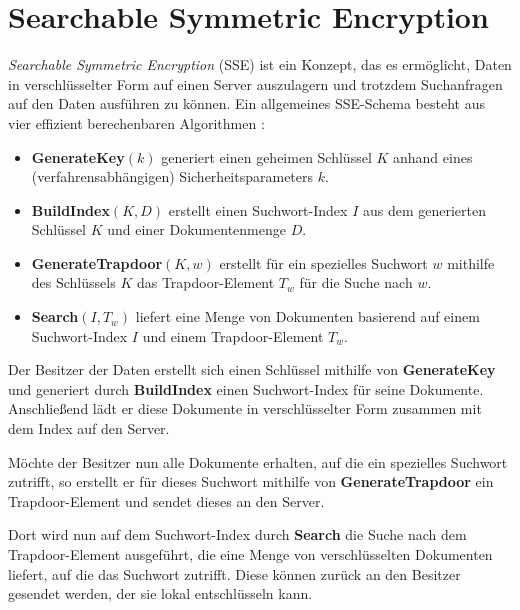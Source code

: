 \section{Searchable Symmetric Encryption}

\label{sec_basisc_se}


\textit{Searchable Symmetric Encryption} (SSE) ist ein Konzept, das es ermöglicht, Daten in verschlüsselter Form auf einen Server auszulagern und trotzdem Suchanfragen auf den Daten ausführen zu können. Ein allgemeines SSE-Schema besteht aus vier effizient berechenbaren Algorithmen \cite{wang2016}:

\begin{itemize}
  \item \textbf{GenerateKey}\((k)\) generiert einen geheimen Schlüssel \(K\) anhand eines (verfahrensabhängigen) Sicherheitsparameters \(k\).
  \item \textbf{BuildIndex}\((K, D)\) erstellt einen Suchwort-Index \(I\) aus dem generierten Schlüssel \(K\) und einer Dokumentenmenge \(D\).
  \item \textbf{GenerateTrapdoor}\((K, w)\) erstellt für ein spezielles Suchwort \(w\) mithilfe des Schlüssels \(K\) das Trapdoor-Element \(T_w\) für die Suche nach \(w\).
  \item \textbf{Search}\((I, T_w)\) liefert eine Menge von Dokumenten basierend auf einem Suchwort-Index \(I\) und einem Trapdoor-Element \(T_w\).
\end{itemize}

Der Besitzer der Daten erstellt sich einen Schlüssel mithilfe von \textbf{GenerateKey} und generiert durch \textbf{BuildIndex} einen Suchwort-Index für seine Dokumente. Anschließend lädt er diese Dokumente in verschlüsselter Form zusammen mit dem Index auf den Server. 

Möchte der Besitzer nun alle Dokumente erhalten, auf die ein spezielles Suchwort zutrifft, so erstellt er für dieses Suchwort mithilfe von \textbf{GenerateTrapdoor} ein Trapdoor-Element und sendet dieses an den Server. 

Dort wird nun auf dem Suchwort-Index durch \textbf{Search} die Suche nach dem Trapdoor-Element ausgeführt, die eine Menge von verschlüsselten Dokumenten liefert, auf die das Suchwort zutrifft. Diese können zurück an den Besitzer gesendet werden, der sie lokal entschlüsseln kann. 